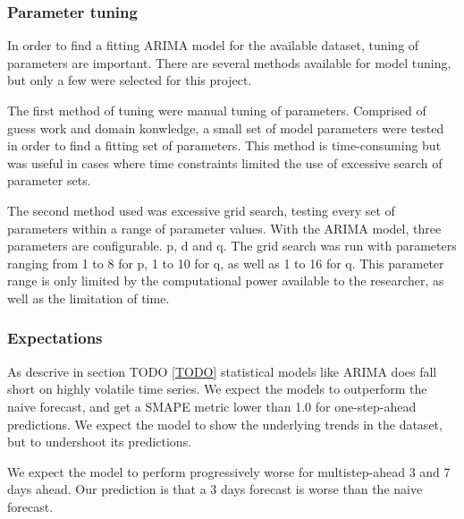 \subsubsection{Parameter tuning}
\label{section:Method:Arima:Tuning}
In order to find a fitting ARIMA model for the available dataset, tuning of parameters are important.
There are several methods available for model tuning, but only a few were selected for this project.

The first method of tuning were manual tuning of parameters.
Comprised of guess work and domain konwledge, a small set of model parameters were tested in order to find a fitting set of parameters.
This method is time-consuming but was useful in cases where time constraints limited the use of excessive search of parameter sets.

The second method used was excessive grid search, testing every set of parameters within a range of parameter values.
With the ARIMA model, three parameters are configurable. p, d and q.
The grid search was run with parameters ranging from 1 to 8 for p, 1 to 10 for q, as well as 1 to 16 for q.
This parameter range is only limited by the computational power available to the researcher, as well as the limitation of time.


\subsubsection{Expectations}
As descrive in section TODO \cref{TODO} statistical models like ARIMA does
fall short on highly volatile time series.
We expect the models to outperform the naive forecast, and get a SMAPE metric
lower than 1.0 for one-step-ahead predictions.
We expect the model to show the underlying trends in the dataset, but to
undershoot its predictions.

We expect the model to perform progressively worse for multistep-ahead 3 and 7
days ahead. Our prediction is that a 3 days forecast is worse than the naive forecast.

